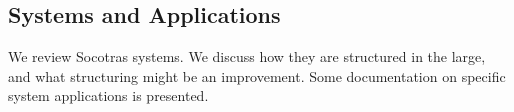 
\begin{partbacktext}
\part{Systems and Applications}
\noindent We review Socotras systems. We discuss how they are structured in the large, and what structuring might be an improvement.
Some documentation on specific system applications is presented.

\end{partbacktext}
